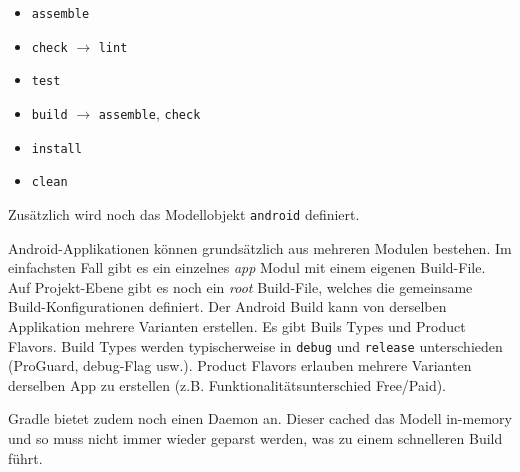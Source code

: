 \begin{itemize}
	\item \texttt{assemble}
	\item \texttt{check} $\rightarrow$ \texttt{lint}
	\item \texttt{test}
	\item \texttt{build} $\rightarrow$ \texttt{assemble}, \texttt{check}
	\item \texttt{install}
	\item \texttt{clean}
\end{itemize}
Zusätzlich wird noch das Modellobjekt \texttt{android} definiert.

Android-Applikationen können grundsätzlich aus mehreren Modulen bestehen. Im einfachsten Fall gibt es ein einzelnes \emph{app} Modul mit einem eigenen Build-File. Auf Projekt-Ebene gibt es noch ein \emph{root} Build-File, welches die gemeinsame Build-Konfigurationen definiert. Der Android Build kann von derselben Applikation mehrere Varianten erstellen. Es gibt Buils Types und Product Flavors. Build Types werden typischerweise in \texttt{debug} und \texttt{release} unterschieden (ProGuard, debug-Flag usw.). Product Flavors erlauben mehrere Varianten derselben App zu erstellen (z.B. Funktionalitätsunterschied Free/Paid).

Gradle bietet zudem noch einen Daemon an. Dieser cached das Modell in-memory und so muss nicht immer wieder geparst werden, was zu einem schnelleren Build führt.